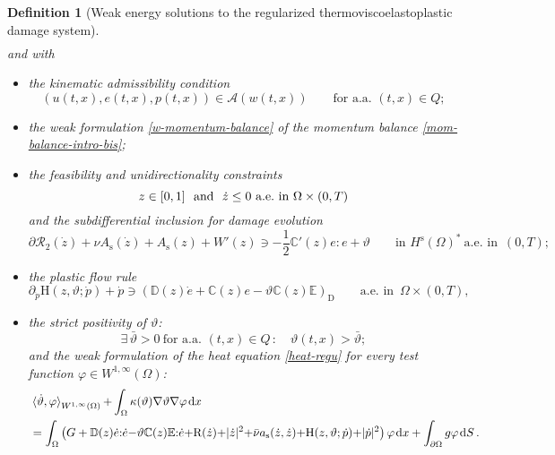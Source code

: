 \documentclass[a4paper,10pt,reqno]{amsart}
\numberwithin{equation}{section}
\numberwithin{equation}{section}
\newtheorem{definition}[theorem]{Definition}
\newcommand{\aein}{\text{a.e.\ in }}
\def\dd{\;\!\mathrm{d}} %
\newcommand{\pairing}[4]{ \sideset{_{ #1 }}{_{ #2 }}  {\mathop{\langle #3 , #4
\rangle}}}
\newcommand{\teta}{\vartheta}
\newcommand{\foraa}{\text{for a.a. }}
\newcommand{\bbC}{\mathbb{C}}
\newcommand{\bbD}{\mathbb{D}}
\newcommand{\bbE}{\mathbb{E}}
\newcommand{\condu}{\kappa}
\newcommand{\dip}[3]{\mathrm{H}(#1,#2;#3)}
\newcommand{\did}[1]{\mathrm{R}(#1)}
\newcommand{\Didv}[1]{\mathcal{R}_{2}(#1)}
\newcommand{\subd}{\partial}
\newcommand{\spz}{H^{\mathrm{s}}(\Omega)}
\newcommand{\As}{A_{\mathrm{s}}}
\newcommand{\ass}{a_{\mathrm{s}}}
\begin{document}
\begin{definition}[Weak energy solutions to the regularized thermoviscoelastoplastic  damage system]
\begin{subequations}
\begin{align}
\end{align}
\end{subequations}
and with  
\begin{itemize}
\item[-] the \emph{kinematic admissibility} condition
\begin{equation}
\label{kin-admis}
(u(t,x), e(t,x), p(t,x)) \in \mathcal{A}(w(t,x)) \qquad \foraa (t,x) \in Q;
\end{equation}
\item[-] the weak formulation \eqref{w-momentum-balance}
of the \emph{momentum balance} \eqref{mom-balance-intro-bis};
\item[-]  the  feasibility and unidirectionality constraints 
   \begin{equation}
   \label{unidir-feasib}
     z \in [0,1]  \ \text{ and } \  \dot z \leq 0 \text{ a.e.\ in $ \Omega \times (0,T)$}
   \end{equation}
  and the subdifferential inclusion for \emph{damage evolution}
  \begin{equation}
\label{dam-Hs-star-intro}
\subd \Didv {\dot z} + \nu \As(\dot z)+ \As (z) + W'(z) \ni - \frac12 \bbC'(z) e :e +\teta \qquad \text{in }\spz^* \ \aein\, (0,T);
\end{equation}
\item[-] 
the \emph{plastic flow rule}
\begin{equation}
\label{plastic-flow-ptw}
\partial_{\dot{p}}  \dip{z}{\teta}{\dot{p}} + \dot{p} \ni (\bbD(z) \dot{e} + \bbC(z) e - \teta \bbC(z) \bbE)_{\mathrm{D}}   \qquad \aein\, \Omega \times (0,T),
\end{equation}
\item[-]  the 
\emph{strict positivity} of $\teta$: 
\begin{equation}
\label{teta-strict-pos}
\exists\, \bar\teta>0  \  \foraa (t,x) \in Q\, : \quad \teta(t,x) > \bar\teta;
\end{equation}
and the weak formulation  of the \emph{heat equation} \eqref{heat-regu} for every test function $ \varphi \in   W^{1,\infty}(\Omega)$:
\begin{equation} \label{eq-teta}
\begin{aligned}
   &
\pairing{}{W^{1,\infty}(\Omega)}{\dot\teta}{\varphi}
+ \int_\Omega \condu(\teta) \nabla \teta\nabla\varphi \dd
x
\\
& = \int_\Omega \left(G+\mathbb{D}(z) \dot e {:} \dot{e} {-} \teta \bbC(z) \bbE {:}  \dot{e} {+} \did{\dot z} {+}|\dot z|^2 {+} \bar\nu\ass(\dot{z}, \dot{z}) 
{+}
\dip z{\teta}{\dot p} {+} |\dot p |^2   \right) \varphi  \dd x  + \int_{\partial\Omega} g \varphi   \dd S\,.
\end{aligned}
\end{equation}
\end{itemize}
\end{definition}
\end{document}
